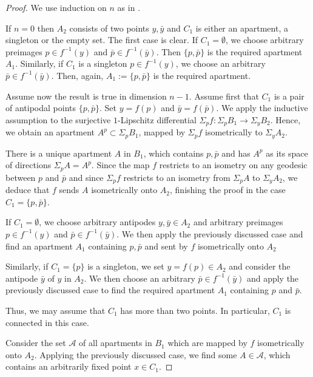 \documentclass[12pt,leqno]{amsart}
\numberwithin{equation}{section}
\theoremstyle{definition}
\theoremstyle{remark}
\begin{document}
	\begin{proof}
	We use induction on $n$ as in   \cite[Proposition 3.9.1]{KleinerLeeb1}. 
	
	
	 If $n=0$ then $A_2$ consists of two points $y, \bar y$ and $C_1$ is either an apartment,  a singleton  or the empty set. 	 The first  case is clear.  	If $C_1=\emptyset$, we  choose arbitrary preimages $p\in f^{-1} (y)$ and $\bar p  \in  f^{-1} (\bar y)$.  Then $\{p, \bar p\}$ is the required apartment $A_1$.  Similarly, if $C_1$ is a singleton $p\in f^{-1} (y)$, we choose an arbitrary $\bar p \in f^{-1} (\bar y)$. Then, again, $A_1:=\{p, \bar p\}$ is the required apartment.
	

	
	Assume now the result is true in dimension $n-1$.    Assume first that 
	$C_1$ is a pair of antipodal points $\{p, \bar p \}$.  Set $y=f(p)$ and $\bar y=f(\bar p)$.  We apply  the inductive assumption to the surjective $1$-Lipschitz differential $\Sigma_p f:\Sigma _p B_1\to \Sigma _y B_2$. Hence, we obtain an apartment $A^p\subset \Sigma _p B_1$, mapped by $\Sigma _p f$ isometrically to $\Sigma _y A_2$.  
	
	There is a unique  apartment $A$ in $B_1$, which contains $p,\bar p$  and has $A^p$
	as its space of directions $\Sigma _p A= A^p$.  Since the map $f$ restricts to an isometry on any geodesic between $p$ and $\bar p$ and since $\Sigma _p f$ restricts to an isometry from $\Sigma _p A$ to $\Sigma _y A_2$, we deduce that $f$ sends $A$ isometrically onto $A_2$, finishing the proof in the case $C_1=\{p, \bar p\}$.
	
	If $C_1=\emptyset$, we choose arbitrary antipodes $y, \bar y \in A_2$ and arbitrary preimages $p\in f^{-1} (y)$ and $\bar p\in f^{-1} (\bar y)$. We then apply the previously discussed case and find an apartment $A_1$ containing $p,\bar p$ and sent by $f$ isometrically onto $A_2$


Similarly, if  $C_1=\{p\}$ is a singleton, we set $y=f(p)\in A_2$ and consider the antipode $\bar y$ of $y$ in $A_2$. We then choose an arbitrary $\bar p \in f^{-1} (\bar y)$ and apply  the previously discussed case to find the required apartment $A_1$ containing $p$ and $\bar p$.  	
	
	
	Thus, we may assume that $C_1$ has more than two points. In particular, $C_1$ is connected in this case.
	 
	
	
	
	
	Consider the set $\mathcal A$ of all apartments in $B_1$ which are mapped by $f$ isometrically onto $A_2$.   Applying the previously discussed case, we find some $A\in  \mathcal A$, which contains an arbitrarily fixed point $x\in C_1$. 
	

\end{proof}
\end{document}
